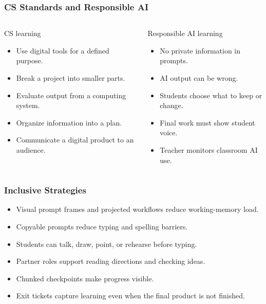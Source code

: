 \documentclass[aspectratio=169]{beamer}
\begin{document}
\begin{frame}
\frametitle{CS Standards and Responsible AI}
\begin{columns}[T,totalwidth=\textwidth]
\begin{block}{CS learning}
\begin{itemize}
\large
\item Use digital tools for a defined purpose.
\item Break a project into smaller parts.
\item Evaluate output from a computing system.
\item Organize information into a plan.
\item Communicate a digital product to an audience.
\end{itemize}
\end{block}
\begin{block}{Responsible AI learning}
\begin{itemize}
\large
\item No private information in prompts.
\item AI output can be wrong.
\item Students choose what to keep or change.
\item Final work must show student voice.
\item Teacher monitors classroom AI use.
\end{itemize}
\end{block}
\end{columns}
\end{frame}

\begin{frame}
\frametitle{Inclusive Strategies}
\begin{itemize}
\large
\item Visual prompt frames and projected workflows reduce working-memory load.
\item Copyable prompts reduce typing and spelling barriers.
\item Students can talk, draw, point, or rehearse before typing.
\item Partner roles support reading directions and checking ideas.
\item Chunked checkpoints make progress visible.
\item Exit tickets capture learning even when the final product is not finished.
\end{itemize}
\end{frame}
\end{document}
